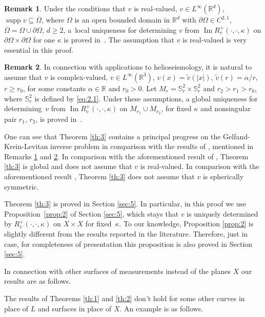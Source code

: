 \documentclass[JEP,XML,SOM,Unicode,NoEqCountersInSection,published]{cedram}
\DeclareMathOperator{\supp}{supp}
\newcommand{\RR}{\mathbb R}
\renewcommand{\Im}{\mathop{\mathrm{Im}}}
\theoremstyle{definition}
\newtheorem{remark}{Remark}
\begin{document}
\begin{remark}\label{rem:2}
Under the conditions that $v$ is real-valued, $v \in L^{\infty}(\RR^d)$, $\supp v \subseteq \overline {\Omega}$,
where $\Omega$ is an open bounded domain in $\RR^d$ with $\partial\Omega \in C^{2,1}$, $\overline {\Omega}=\Omega \cup \partial\Omega$, $d \geq 2$,
a~local uniqueness for determining $v$ from
$\Im R_v^+(\cdot, \cdot, \kappa)$ on $\partial\Omega \times \partial\Omega$ for one $\kappa$
is proved in~\cite{AHN1}. The assumption that $v$ is real-valued is very essential in this proof.
\end{remark}

\begin{remark}\label{rem:3}
In connection with applications to helioseismology, it is natural to assume that $v$ is complex-valued, $v \in L^{\infty}(\RR^3)$, $v(x)=\tilde v(|x|)$, $\tilde v(r)=\alpha/r$, $r \geq r_0$,
for some constants $\alpha \in \RR$ and $r_0>0$. Let $M_r=\mathbb S^2_r \times \mathbb S^2_r$ and $r_2>r_1>r_0$,
where $\mathbb S^2_r$ is defined by \eqref{eq:2.1}.
Under these assumptions, a global uniqueness for determining~$v$ from
$\Im R_v^+(\cdot, \cdot, \kappa)$ on $M_{r_1} \cup M_{r_2}$, for fixed $\kappa$ and nonsingular pair $r_1$, $r_2$,
is proved in~\cite{AHN2}.
\end{remark}

One can see that
Theorem \ref{th:3} contains a principal progress on the Gelfand-Krein-Levitan inverse problem in comparison with the results of \cite{AHN1}, \cite{AHN2} mentioned in Remarks \ref{rem:2} and \ref{rem:3}.
In comparison with the aforementioned result of \cite{AHN1}, Theorem \ref{th:3} is global and does not assume that $v$ is real-valued.
In comparison with the aforementioned result \cite{AHN2}, Theorem \ref{th:3} does not assume that $v$ is spherically symmetric.

Theorem \ref{th:3} is proved in Section \ref{sec:5}.
In particular, in this proof we use Proposition~\ref{prop:2} of Section \ref{sec:5},
which stays that $v$ is uniquely determined by $R_v^+(\cdot, \cdot, \kappa)$ on $X\times X$ for fixed~$\kappa$.
To our knowledge, Proposition \ref{prop:2} is slightly different from the results reported in the literature.
Therefore, just in case, for completeness of presentation this proposition is also proved in Section \ref{sec:5}.

In connection with other surfaces of measurements instead of the planes $X$ our results are as follows.

The results of Theorems \ref{th:1} and \ref{th:2} don't hold for some other curves in place of $L$ and surfaces in place of $X$.
An example is as follows.
\end{document}
